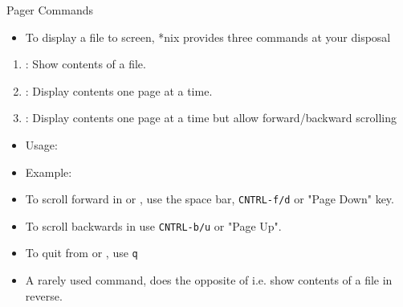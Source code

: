 \documentclass[10pt,t]{beamer}
\begin{document}
\begin{frame}[fragile]{Pager Commands}
  \begin{itemize}
    \item To display a file to screen, *nix provides three commands at your disposal
  \end{itemize}
  \begin{enumerate}
    \item {}: Show contents of a file.
    \item {}: Display contents one page at a time.
    \item {}: Display contents one page at a time but allow forward/backward scrolling
  \end{enumerate}
  \begin{itemize}
  \item Usage: 
  \item Example: 
  \item To scroll forward in  or , use the space bar, \texttt{CNTRL-f/d} or "Page Down" key.
  \item To scroll backwards in  use \texttt{CNTRL-b/u} or "Page Up".
  \item To quit from  or , use \texttt{q}
  \item A rarely used command,  does the opposite of  i.e. show contents of a file in reverse.
  \end{itemize}
\end{frame}
\end{document}
